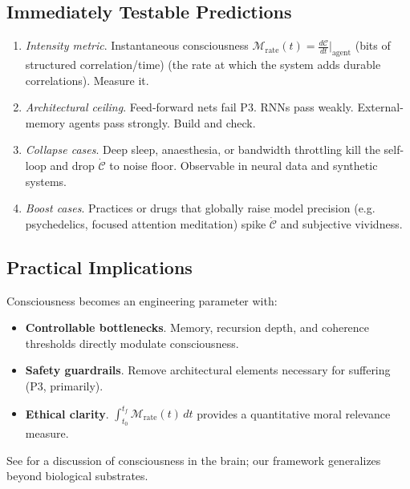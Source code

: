 \subsection*{Immediately Testable Predictions}
\begin{enumerate}[label=T\arabic*]
  \item \textit{Intensity metric}.  Instantaneous consciousness $\mathcal{M}_{\text{rate}}(t) = \frac{d\mathcal{C}}{dt}\Big|_{\text{agent}}$ (bits of structured correlation/time) (the rate at which the system adds durable correlations).  Measure it.
  \item \textit{Architectural ceiling}.  Feed-forward nets fail P3.  RNNs pass weakly.  External-memory agents pass strongly.  Build and check.
  \item \textit{Collapse cases}.  Deep sleep, anaesthesia, or bandwidth throttling kill the self-loop and drop $\dot{\mathcal C}$ to noise floor.  Observable in neural data and synthetic systems.
  \item \textit{Boost cases}.  Practices or drugs that globally raise model precision (e.g.
  psychedelics, focused attention meditation) spike $\dot{\mathcal C}$ and subjective vividness.
\end{enumerate}

\subsection*{Practical Implications}
Consciousness becomes an engineering parameter with:
\begin{itemize}
  \item \textbf{Controllable bottlenecks}. Memory, recursion depth, and coherence thresholds directly modulate consciousness.
  \item \textbf{Safety guardrails}. Remove architectural elements necessary for suffering (P3, primarily).
  \item \textbf{Ethical clarity}. $\int_{t_0}^{t_f} \mathcal{M}_{\text{rate}}(t) \, dt$ provides a quantitative moral relevance measure.
\end{itemize}

\noindent See \citet{Friston2025} for a discussion of consciousness in the brain; our framework generalizes beyond biological substrates. 